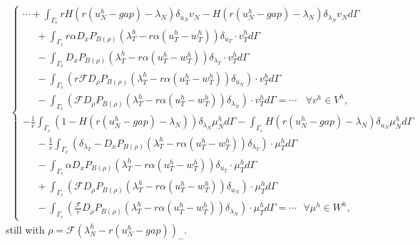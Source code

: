 \documentclass[a4paper,11pt,english]{sphinxmanual}
\begin{document}
\begin{equation*}
\begin{split}\left\{\begin{array}{l}
\cdots + \displaystyle \int_{\Gamma_c} rH(r(u^h_N-gap)-\lambda_N)\delta_{u_N} v_N -  H(r(u^h_N-gap)-\lambda_N)\delta_{\lambda_N} v_N d\Gamma \\
~~~~~~+ \displaystyle \int_{\Gamma_c} r \alpha D_xP_{B(\rho)}(\lambda^h_T - r\alpha(u^h_T-w^h_T)) \delta_{u_T}\cdot v^h_T d\Gamma \\
~~~~~~- \displaystyle \int_{\Gamma_c} D_xP_{B(\rho)}(\lambda^h_T - r\alpha(u^h_T-w^h_T)) \delta_{\lambda_T}\cdot v^h_T d\Gamma \\
~~~~~~- \displaystyle \int_{\Gamma_c} (r{\mathscr F} D_{\rho}P_{B(\rho)}(\lambda^h_T - r\alpha(u^h_T-w^h_T)) \delta_{u_N})\cdot v^h_T d\Gamma \\
~~~~~~- \displaystyle \int_{\Gamma_c} ({\mathscr F} D_{\rho}P_{B(\rho)}(\lambda^h_T - r\alpha(u^h_T-w^h_T)) \delta_{\lambda_N})\cdot v^h_T d\Gamma = \cdots  ~~~~ \forall v^h \in V^h, \\
\displaystyle -\frac{1}{r}\int_{\Gamma_c}(1-H(r(u^h_N-gap)-\lambda_N))\delta_{\lambda_N}\mu^h_N d\Gamma
\displaystyle -\int_{\Gamma_c}H(r(u^h_N-gap)-\lambda_N)\delta_{u_N}\mu^h_N d\Gamma \\
~~~~~~\displaystyle -\frac{1}{r}\int_{\Gamma_c}(\delta_{\lambda_T} - D_xP_{B(\rho)}(\lambda^h_T - r\alpha(u^h_T-w^h_T))\delta_{\lambda_T})\cdot\mu^h_T d\Gamma \\
~~~~~~\displaystyle -\int_{\Gamma_c}\alpha D_xP_{B(\rho)}(\lambda^h_T - r\alpha(u^h_T-w^h_T))\delta_{u_T}\cdot\mu^h_T d\Gamma \\
~~~~~~ \displaystyle +\int_{\Gamma_c}({\mathscr F} D_{\rho}P_{B(\rho)}(\lambda^h_T - r\alpha(u^h_T-w^h_T))\delta_{u_N})\cdot\mu^h_T d\Gamma \\
~~~~~~ \displaystyle -\int_{\Gamma_c}(\frac{\mathscr F}{r} D_{\rho}P_{B(\rho)}(\lambda^h_T - r\alpha(u^h_T-w^h_T))\delta_{\lambda_N})\cdot\mu^h_T d\Gamma = \cdots ~~~ \forall \mu^h \in W^h,
\end{array}\right.\end{split}
\end{equation*}
still with \(\rho={\mathscr F}(\lambda^h_N - r(u^h_N-gap))_-\).
\end{document}
